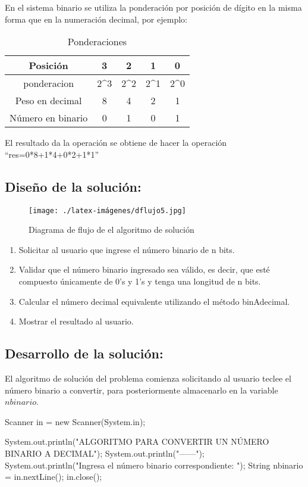 En el sistema binario se utiliza la ponderación por posición de dígito en la misma forma que en la numeración decimal, por ejemplo:

\begin{table}[h!]
     \centering
     \caption{Ponderaciones}
     
     \begin{tabular}{|c|c|c|c|c|}
     \hline
        Posición & 3 & 2 & 1 & 0 \\
        \hline
        ponderacion  & 2^{3} & 2^{2} & 2^{1} & 2^{0} \\
        \hline
        Peso en decimal  & 8 & 4 & 2 & 1 \\
        \hline
        Número en binario  & 0 & 1 & 0 & 1 \\
        \hline
     \end{tabular}
     \label{tab:my_label}
 \end{table}

El resultado da la operación se obtiene de hacer la operación “res=0*8+1*4+0*2+1*1”

\subsection{\textbf{Diseño de la solución:}}

\begin{figure}[h!]
    \centering
    \texttt{[image: ./latex-imágenes/dflujo5.jpg]}
    \caption{Diagrama de flujo de el algoritmo de solución}
    \label{}
\end{figure}

\begin{enumerate}
    \item Solicitar al usuario que ingrese el número binario de n bits.
    \item Validar que el número binario ingresado sea válido, es decir, que esté compuesto únicamente de 0's y 1's y tenga una longitud de n bits.
    \item Calcular el número decimal equivalente utilizando el método binAdecimal.
    \item Mostrar el resultado al usuario.
\end{enumerate}

\subsection{\textbf{Desarrollo de la solución:}}

El algoritmo de solución del problema comienza solicitando al usuario teclee el número binario a convertir, para posteriormente almacenarlo en la variable $nbinario$.
\begin{javaCode}

Scanner in = new Scanner(System.in);
        
    System.out.println("ALGORITMO PARA CONVERTIR UN NÚMERO BINARIO A DECIMAL");
    System.out.println("------");
    System.out.println("Ingresa el número binario correspondiente: ");
    String nbinario = in.nextLine();
    in.close();
        
\end{javaCode}

